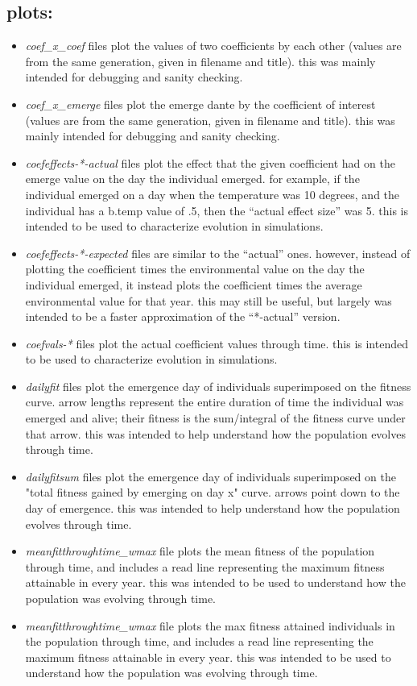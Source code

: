 \documentclass[11pt,a4paper]{article}
\begin{document}
\subsection{plots:}
\begin{itemize}
\item \textit{coef\_x\_coef} files plot the values of two coefficients by each other (values are from the same generation, given in filename and title). this was mainly intended for debugging and sanity checking.
\item \textit{coef\_x\_emerge} files plot the emerge dante by the coefficient of interest (values are from the same generation, given in filename and title). this was mainly intended for debugging and sanity checking.
\item \textit{coefeffects-*-actual} files plot the effect that the given coefficient had on the emerge value on the day the individual emerged. for example, if the individual emerged on a day when the temperature was 10 degrees, and the individual has a b.temp value of .5, then the ``actual effect size'' was 5. this is intended to be used to characterize evolution in simulations.
\item \textit{coefeffects-*-expected} files are similar to the ``actual'' ones. however, instead of plotting the coefficient times the environmental value on the day the individual emerged, it instead plots the coefficient times the average environmental value for that year. this may still be useful, but largely was intended to be a faster approximation of the ``*-actual'' version.
\item \textit{coefvals-*} files plot the actual coefficient values through time. this is intended to be used to characterize evolution in simulations.
\item \textit{dailyfit} files plot the emergence day of individuals superimposed on the fitness curve. arrow lengths represent the entire duration of time the individual was emerged and alive; their fitness is the sum/integral of the fitness curve under that arrow. this was intended to help understand how the population evolves through time.
\item \textit{dailyfitsum} files plot the emergence day of individuals superimposed on the "total fitness gained by emerging on day x" curve. arrows point down to the day of emergence. this was intended to help understand how the population evolves through time.
\item \textit{meanfitthroughtime\_wmax} file plots the mean fitness of the population through time, and includes a read line representing the maximum fitness attainable in every year. this was intended to be used to understand how the population was evolving through time.
\item \textit{meanfitthroughtime\_wmax} file plots the max fitness attained individuals in the population through time, and includes a read line representing the maximum fitness attainable in every year. this was intended to be used to understand how the population was evolving through time.
\end{itemize}
\end{document}
